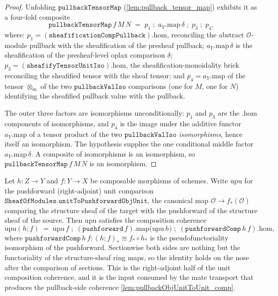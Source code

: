 \begin{proof}
  \leanok
  Unfolding \(\mathtt{pullbackTensorMap}\) (\cref{lem:pullback_tensor_map}) exhibits it as a
  four-fold composite
  \[
    \mathtt{pullbackTensorMap}\,f\,M\,N
      \;=\;
    p_1 \;\mathbin{;}\; a_Y.\mathrm{map}\,\delta \;\mathbin{;}\; p_3 \;\mathbin{;}\; p_4,
  \]
  where:
  \(p_1 = (\mathtt{sheafificationCompPullback}).\mathrm{hom}\), reconciling the abstract
  \(\mathcal{O}\)-module pullback with the sheafification of the presheaf pullback;
  \(a_Y.\mathrm{map}\,\delta\) is the sheafification of the presheaf-level oplax comparison
  \(\delta\); \(p_3 = (\mathtt{sheafifyTensorUnitIso}).\mathrm{hom}\), the
  sheafification-monoidality brick reconciling the sheafified tensor with the sheaf tensor;
  and \(p_4 = a_Y.\mathrm{map}\) of the tensor \(\otimes_{\mathrm{m}}\) of the two
  \(\mathtt{pullbackValIso}\) comparisons (one for \(M\), one for \(N\)) identifying the
  sheafified pullback value with the pullback.

  The outer three factors are isomorphisms unconditionally: \(p_1\) and \(p_3\) are the
  \(.\mathrm{hom}\) components of isomorphisms, and \(p_4\) is the image under the additive
  functor \(a_Y.\mathrm{map}\) of a tensor product of the two \(\mathtt{pullbackValIso}\)
  \emph{isomorphisms}, hence itself an isomorphism. The hypothesis supplies the one
  conditional middle factor \(a_Y.\mathrm{map}\,\delta\). A composite of isomorphisms is an
  isomorphism, so \(\mathtt{pullbackTensorMap}\,f\,M\,N\) is an isomorphism.
\end{proof}

\begin{lemma}


  \label{lem:unitToPushforwardObjUnit_comp}
  Let \(h : Z \to Y\) and \(f : Y \to X\) be composable morphisms of schemes. Write
  \(\mathrm{upu}\) for the pushforward (right-adjoint) unit comparison
  \(\mathtt{SheafOfModules.unitToPushforwardObjUnit}\), the canonical map
  \(\mathcal{O} \to f_*(\mathcal{O})\) comparing the structure sheaf of the target with
  the pushforward of the structure sheaf of the source. Then \(\mathrm{upu}\) satisfies
  the composition coherence
  \[
    \mathrm{upu}(h \mathbin{;} f)
      \;=\;
    \mathrm{upu}\,f \;\mathbin{;}\;
      (\mathtt{pushforward}\,f).\mathrm{map}\bigl(\mathrm{upu}\,h\bigr) \;\mathbin{;}\;
      (\mathtt{pushforwardComp}\,h\,f).\mathrm{hom},
  \]
  where \(\mathtt{pushforwardComp}\,h\,f : (h \mathbin{;} f)_* \cong f_* \circ h_*\) is the
  pseudofunctoriality isomorphism of the pushforward. Sectionwise both sides are nothing
  but the functoriality of the structure-sheaf ring maps, so the identity holds on the
  nose after the comparison of sections. This is the right-adjoint half of the unit
  composition coherence, and it is the input consumed by the mate transport that produces
  the pullback-side coherence \cref{lem:pullbackObjUnitToUnit_comp}.
\end{lemma}

